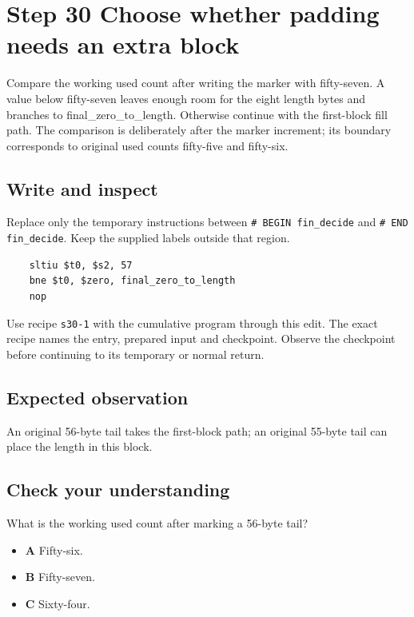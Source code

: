 \section{Step 30 Choose whether padding needs an extra block}\label{sha-s30}

Compare the working used count after writing the marker with fifty-seven. A value below fifty-seven leaves enough room for the eight length bytes and branches to final\_zero\_to\_length. Otherwise continue with the first-block fill path. The comparison is deliberately after the marker increment; its boundary corresponds to original used counts fifty-five and fifty-six.

\subsection{Write and inspect}
Replace only the temporary instructions between \texttt{\# BEGIN fin\_decide} and \texttt{\# END fin\_decide}. Keep the supplied labels outside that region.

\begin{verbatim}
    sltiu $t0, $s2, 57
    bne $t0, $zero, final_zero_to_length
    nop
\end{verbatim}

Use recipe \texttt{s30-1} with the cumulative program through this edit. The exact recipe names the entry, prepared input and checkpoint. Observe the checkpoint before continuing to its temporary or normal return.

\subsection{Expected observation}
An original 56-byte tail takes the first-block path; an original 55-byte tail can place the length in this block.

\subsection{Check your understanding}
What is the working used count after marking a 56-byte tail?

\begin{itemize}
  \item \textbf{A} Fifty-six.
  \item \textbf{B} Fifty-seven.
  \item \textbf{C} Sixty-four.
\end{itemize}

